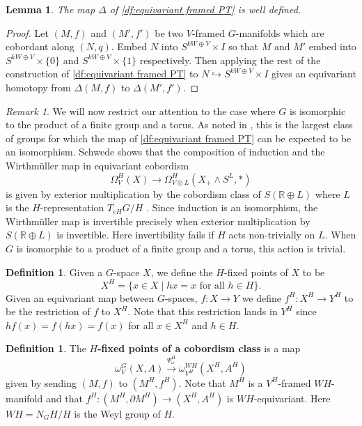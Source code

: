 \documentclass[11pt]{amsart}
\newcommand{\R}{\mathbb R}
\theoremstyle{plain}   %
\newtheorem{lem}[thm]{Lemma}
\theoremstyle{definition}
\newtheorem{df}[thm]{Definition}
\theoremstyle{remark}
\newtheorem{rmk}[thm]{Remark}
\numberwithin{equation}{section}
\begin{document}
\begin{lem}
The map $\Delta$ of \cref{df:equivariant framed PT} is well defined. 
\end{lem}
\begin{proof}
Let $(M,f)$ and $(M',f')$ be two $V$-framed $G$-manifolds which are cobordant along $(N,q)$. Embed $N$ into $S^{kW\oplus V}\times I$ so that $M$ and $M'$ embed into $S^{kW\oplus V}\times\{0\}$ and $S^{kW\oplus V}\times\{1\}$ respectively. Then applying the rest of the construction of \ref{df:equivariant framed PT} to $N\hookrightarrow S^{kW\oplus V}\times I$ gives an equivariant homotopy from $\Delta(M,f)$ to $\Delta(M',f')$.
\end{proof} 

\begin{rmk}
We will now restrict our attention to the case where $G$ is isomorphic to the product of a finite group and a torus. As noted in \cite[6.2.13]{schwede_global}, this is the largest class of groups for which the map of \cref{df:equivariant framed PT} can be expected to be an isomorphism. Schwede shows that the composition of induction and the Wirthm\"uller map in equivariant cobordism
\[
\Omega_V^H(X) \to \Omega_{V\oplus L}^H\left(X_+\wedge S^L,*\right)
\] 
is given by exterior multiplication by the cobordism class of $S(\R\oplus L)$ where $L$  is the $H$-representation $T_{eH}G/H$ \cite[6.2.12]{schwede_global}. Since induction is an isomorphism, the Wirthm\"uller map is invertible precisely when exterior multiplication by $S(\R\oplus L)$ is invertible. Here invertibility fails if $H$ acts non-trivially on $L$. When $G$ is isomorphic to a product of a finite group and a torus, this action is trivial. 
\end{rmk}

\begin{df}
Given a $G$-space $X$, we define the $H$-fixed points of $X$ to be
\[
X^H=\{x\in X\mid hx=x \text{ for all } h\in H\}.
\]
Given an equivariant map between $G$-spaces, $f:X\to Y$ we define $f^H:X^H\to Y^H$ to be the restriction of $f$ to $X^H$. Note that this restriction lands in $Y^H$ since $hf(x)=f(hx)=f(x)$ for all $x\in X^H$ and $h\in H$. 
\end{df}

\begin{df}\label{df:fixed points of cobordism}
The \textbf{$H$-fixed points of a cobordism class} is a map
\[
\omega_V^G(X,A) \xrightarrow{\Psi_\omega^H} \omega_{V^H}^{WH}(X^H,A^H)
\]
given by sending $(M,f)$ to $(M^H,f^H)$. Note that $M^H$ is a $V^H$-framed $WH$-manifold and that $f^H:(M^H,\partial M^H)\to (X^H,A^H)$ is $WH$-equivariant. Here $WH=N_GH/H$ is the Weyl group of $H$.
\end{df}
\end{document}
